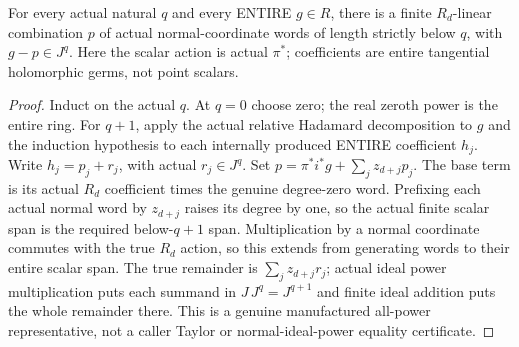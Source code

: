 \begin{theorem}
\label{hir:relative-normal-all-power-representatives}
\leanok
For every actual natural $q$ and every ENTIRE $g\in R$, there is a finite
$R_d$-linear combination $p$ of actual normal-coordinate words of length
strictly below $q$, with $g-p\in J^q$. Here the scalar action is actual $\pi^*$;
coefficients are entire tangential holomorphic germs, not point scalars.
\end{theorem}
\begin{proof}
Induct on the actual $q$. At $q=0$ choose zero; the real zeroth power is the
entire ring. For $q+1$, apply the actual relative Hadamard decomposition to $g$
and the induction hypothesis to each internally produced ENTIRE coefficient
$h_j$. Write $h_j=p_j+r_j$, with actual $r_j\in J^q$. Set
$p=\pi^*i^*g+\sum_j z_{d+j}p_j$. The base term is its actual $R_d$ coefficient
times the genuine degree-zero word. Prefixing each actual normal word by
$z_{d+j}$ raises its degree by one, so the actual finite scalar span is the
required below-$q+1$ span. Multiplication by a normal coordinate commutes with
the true $R_d$ action, so this extends from generating words to their entire
scalar span. The true remainder is $\sum_j z_{d+j}r_j$; actual ideal power
multiplication puts each summand in $J\,J^q=J^{q+1}$ and finite ideal addition
puts the whole remainder there. This is a genuine manufactured all-power
representative, not a caller Taylor or normal-ideal-power equality certificate.
\end{proof}

